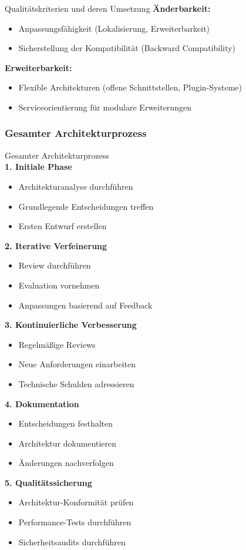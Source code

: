 \begin{corollary}{Qualitätskriterien und deren Umsetzung}
\textbf{Änderbarkeit:}
\begin{itemize}
    \item Anpassungsfähigkeit (Lokalisierung, Erweiterbarkeit)
    \item Sicherstellung der Kompatibilität (Backward Compatibility)
\end{itemize}

\textbf{Erweiterbarkeit:}
\begin{itemize}
    \item Flexible Architekturen (offene Schnittstellen, Plugin-Systeme)
    \item Serviceorientierung für modulare Erweiterungen
\end{itemize}
\end{corollary}

\subsubsection{Gesamter Architekturprozess}

\begin{KR}{Gesamter Architekturprozess}\\
\textbf{1. Initiale Phase}
\begin{itemize}
    \item Architekturanalyse durchführen
    \item Grundlegende Entscheidungen treffen
    \item Ersten Entwurf erstellen
\end{itemize}

\textbf{2. Iterative Verfeinerung}
\begin{itemize}
    \item Review durchführen
    \item Evaluation vornehmen
    \item Anpassungen basierend auf Feedback
\end{itemize}

\textbf{3. Kontinuierliche Verbesserung}
\begin{itemize}
    \item Regelmäßige Reviews
    \item Neue Anforderungen einarbeiten
    \item Technische Schulden adressieren
\end{itemize}

\textbf{4. Dokumentation}
\begin{itemize}
    \item Entscheidungen festhalten
    \item Architektur dokumentieren
    \item Änderungen nachverfolgen
\end{itemize}

\textbf{5. Qualitätssicherung}
\begin{itemize}
    \item Architektur-Konformität prüfen
    \item Performance-Tests durchführen
    \item Sicherheitsaudits durchführen
\end{itemize}
\end{KR}

